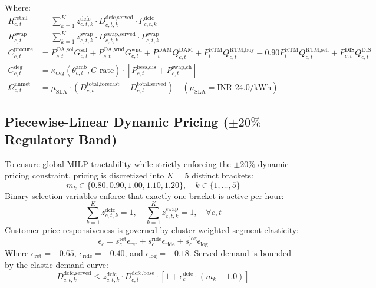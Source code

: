 \documentclass[10.5pt,a4paper]{article}
\begin{document}
Where:
\begin{align}
R_{c,t}^{\text{retail}} &= \sum_{k=1}^K z_{c,t,k}^{\text{dcfc}} \cdot D_{c,t,k}^{\text{dcfc,served}} \cdot P_{c,t,k}^{\text{dcfc}} \\
R_{c,t}^{\text{swap}} &= \sum_{k=1}^K z_{c,t,k}^{\text{swap}} \cdot D_{c,t,k}^{\text{swap,served}} \cdot P_{c,t,k}^{\text{swap}} \\
C_{c,t}^{\text{procure}} &= P_{c,t}^{\text{OA,sol}} G_{c,t}^{\text{sol}} + P_{c,t}^{\text{OA,wnd}} G_{c,t}^{\text{wnd}} + P_{t}^{\text{DAM}} Q_{c,t}^{\text{DAM}} + P_{t}^{\text{RTM}} Q_{c,t}^{\text{RTM,buy}} - 0.90 P_{t}^{\text{RTM}} Q_{c,t}^{\text{RTM,sell}} + P_{c,t}^{\text{DIS}} Q_{c,t}^{\text{DIS}} \\
C_{c,t}^{\text{deg}} &= \kappa_{\text{deg}}(\theta_{c,t}^{\text{amb}}, C\text{-rate}) \cdot \left[ P_{c,t}^{\text{bess,dis}} + P_{c,t}^{\text{swap,ch}} \right] \\
\Omega_{c,t}^{\text{unmet}} &= \mu_{\text{SLA}} \cdot \left( D_{c,t}^{\text{total,forecast}} - D_{c,t}^{\text{total,served}} \right) \quad (\mu_{\text{SLA}} = \text{INR~}24.0/\text{kWh})
\end{align}

\subsection{Piecewise-Linear Dynamic Pricing (\texorpdfstring{$\pm 20\%$}{+/- 20\%} Regulatory Band)}
To ensure global MILP tractability while strictly enforcing the $\pm 20\%$ dynamic pricing constraint, pricing is discretized into $K=5$ distinct brackets:
\begin{equation}
m_k \in \{0.80, 0.90, 1.00, 1.10, 1.20\}, \quad k \in \{1,\dots,5\}
\end{equation}
Binary selection variables enforce that exactly one bracket is active per hour:
\begin{equation}
\sum_{k=1}^K z_{c,t,k}^{\text{dcfc}} = 1, \quad \sum_{k=1}^K z_{c,t,k}^{\text{swap}} = 1, \quad \forall c, t
\end{equation}
Customer price responsiveness is governed by cluster-weighted segment elasticity:
\begin{equation}
\bar{\epsilon}_c = s_c^{\text{ret}} \epsilon_{\text{ret}} + s_c^{\text{ride}} \epsilon_{\text{ride}} + s_c^{\text{log}} \epsilon_{\text{log}}
\end{equation}
Where $\epsilon_{\text{ret}} = -0.65$, $\epsilon_{\text{ride}} = -0.40$, and $\epsilon_{\text{log}} = -0.18$. Served demand is bounded by the elastic demand curve:
\begin{equation}
D_{c,t,k}^{\text{dcfc,served}} \le z_{c,t,k}^{\text{dcfc}} \cdot D_{c,t}^{\text{dcfc,base}} \cdot \left[ 1 + \bar{\epsilon}_c^{\text{dcfc}} \cdot (m_k - 1.0) \right]
\end{equation}
\end{document}
